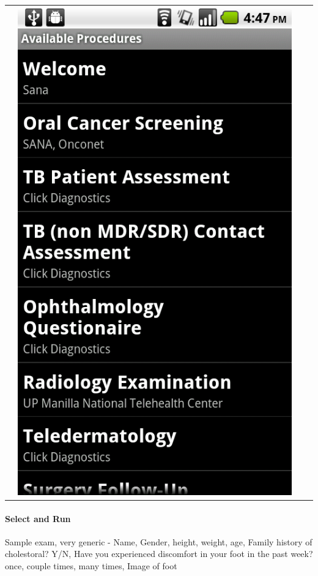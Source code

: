 \documentclass[a4paper,10pt]{article}
\begin{document}
\begin{flushleft}
\begin{tabular}{ c c c c }
&\includegraphics[scale=0.15,keepaspectratio=true]{client_select_procedure.png}
\end{tabular}
\end{flushleft}

\paragraph{Select and Run}Sample exam, very generic
 - Name, Gender, height, weight, age, Family history of cholestoral? Y/N, Have 
you experienced discomfort in your foot in the past week? once, couple times, 
many times, Image of foot
\end{document}
